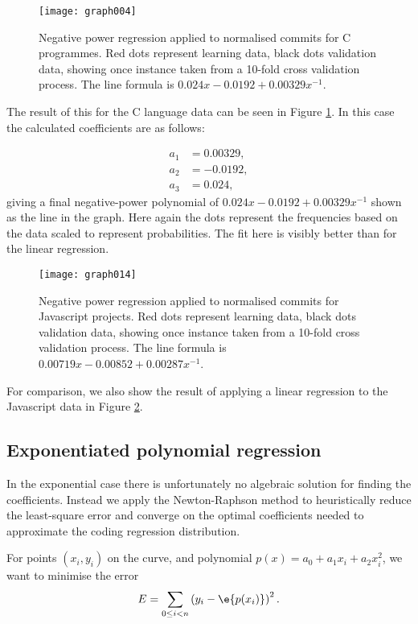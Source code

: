 \documentclass[10pt,journal,compsoc]{IEEEtran}
\begin{document}
\begin{figure}[t]
\centering
\texttt{[image: graph004]}%
\caption{\label{fig:c-negpow}Negative power regression applied to normalised commits for C programmes. Red dots represent learning data, black dots validation data, showing once instance taken from a 10-fold cross validation process. The line formula is $0.024x - 0.0192 + 0.00329x^{-1}$.}
\end{figure}

The result of this for the C language data can be seen in Figure \ref{fig:c-negpow}. In this case the calculated coefficients are as follows:

\begin{align*}
a_1 & = 0.00329, \\
a_2 & = -0.0192, \\
a_3 & = 0.024,
\end{align*}
giving a final negative-power polynomial of $0.024x - 0.0192 + 0.00329x^{-1}$ shown as the line in the graph. Here again the dots represent the frequencies based on the data scaled to represent probabilities. The fit here is visibly better than for the linear regression.

\begin{figure}[t]
\centering
\texttt{[image: graph014]}%
\caption{\label{fig:javascript-negpow}Negative power regression applied to normalised commits for Javascript projects. Red dots represent learning data, black dots validation data, showing once instance taken from a 10-fold cross validation process. The line formula is $0.00719x - 0.00852 + 0.00287x^{-1}$.}
\end{figure}

For comparison, we also show the result of applying a linear regression to the Javascript data in Figure \ref{fig:javascript-negpow}.

\subsection{Exponentiated polynomial regression}

In the exponential case there is unfortunately no algebraic solution for finding the coefficients. Instead we apply the Newton-Raphson method to heuristically reduce the least-square error and converge on the optimal coefficients needed to approximate the coding regression distribution.

For points $(x_i, y_i)$ on the curve, and polynomial $p(x) = a_0 + a_1 x_i + a_2 x_i^2$, we want to minimise the error
$$
E = \sum_{0 \le i < n} \left( y_i - \e{p(x_i)} \right)^2 .
$$
\end{document}
